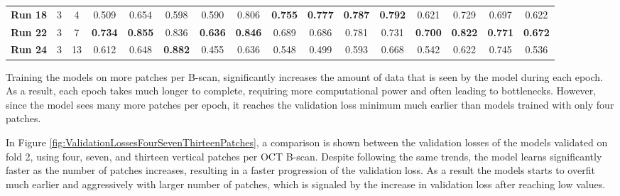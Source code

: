 \begin{table}[!ht]
{\begin{tabular}{|c|c|c|ccc|ccc|ccc|c|c|c|c|}
		\hline
		\hline
		
		\textbf{Run 18} & 3 & 4 & \multicolumn{1}{c|}{0.509} & \multicolumn{1}{c|}{0.654} & 0.598 & \multicolumn{1}{c|}{0.590} & \multicolumn{1}{c|}{0.806} & \textbf{0.755} & \multicolumn{1}{c|}{\textbf{0.777}} & \multicolumn{1}{c|}{\textbf{0.787}} & \textbf{0.792} & 0.621 & 0.729 & 0.697 & 0.622 \\
		
		\textbf{Run 22} & 3 & 7 & \multicolumn{1}{c|}{\textbf{0.734}} & \multicolumn{1}{c|}{\textbf{0.855}} & 0.836 & \multicolumn{1}{c|}{\textbf{0.636}} & \multicolumn{1}{c|}{\textbf{0.846}} & 0.689 & \multicolumn{1}{c|}{0.686} & \multicolumn{1}{c|}{0.781} & 0.731 & \textbf{0.700} & \textbf{0.822} & \textbf{0.771} & \textbf{0.672} \\
		
		\textbf{Run 24} & 3 & 13 & \multicolumn{1}{c|}{0.612} & \multicolumn{1}{c|}{0.648} & \textbf{0.882} & \multicolumn{1}{c|}{0.455} & \multicolumn{1}{c|}{0.636} & 0.548 & \multicolumn{1}{c|}{0.499} & \multicolumn{1}{c|}{0.593} & 0.668 & 0.542 & 0.622 & 0.745 & 0.536 \\
		
		\hline
			
	\end{tabular}}
	\label{tab:Experiment1.3SevenVsThirteenPatches}
\end{table}

Training the models on more patches per B-scan, significantly increases the amount of data that is seen by the model during each epoch. As a result, each epoch takes much longer to complete, requiring more computational power and often leading to bottlenecks. However, since the model sees many more patches per epoch, it reaches the validation loss minimum much earlier than models trained with only four patches. 
\par
In Figure \ref{fig:ValidationLossesFourSevenThirteenPatches}, a comparison is shown between the validation losses of the models validated on fold 2, using four, seven, and thirteen vertical patches per OCT B-scan. Despite following the same trends, the model learns significantly faster as the number of patches increases, resulting in a faster progression of the validation loss. As a result the models starts to overfit much earlier and aggressively with larger number of patches, which is signaled by the increase in validation loss after reaching low values.

